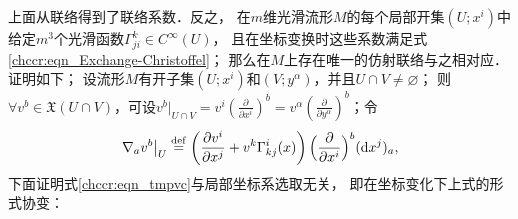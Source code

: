 上面从联络得到了联络系数．反之，
在$m$维光滑流形$M$的每个局部开集$(U;x^i)$中给定$m^3$个光滑函数$\Gamma^{k}_{ji}\in C^\infty(U)$，
且在坐标变换时这些系数满足式\eqref{chccr:eqn_Exchange-Christoffel}；
那么在$M$上存在唯一的仿射联络与之相对应．证明如下；
设流形$M$有开子集$(U;x^i)$和$(V;y^\alpha)$，并且$U\cap V \neq \varnothing$；
则$\forall v^b\in \mathfrak{X}(U\cap V)$，可设$v^b|_{U\cap V}
=v^i(\frac{\partial}{\partial x^i})^b
=v^\alpha(\frac{\partial}{\partial y^\alpha})^b$；令
\begin{equation}\label{chccr:eqn_tmpvc}
       \left. \nabla_a v^b \right|_{U}  \overset{\mathrm {def}}{=}
    \left(\frac{\partial v^i}{\partial x^j} +v^k \Gamma_{kj}^{i}(x) \right)
           \Bigl(\frac{\partial}{\partial x^i}\Bigr)^b ({\rm d}x^j)_a ,
\end{equation}
下面证明式\eqref{chccr:eqn_tmpvc}与局部坐标系选取无关，
即在坐标变化下上式的形式协变：

